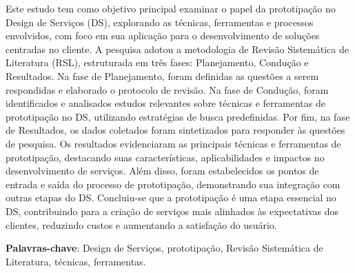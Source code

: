 \begin{resumo}
Este estudo tem como objetivo principal examinar o papel da prototipação no Design de Serviços (DS), explorando as técnicas, ferramentas e processos envolvidos, com foco em sua aplicação para o desenvolvimento de soluções centradas no cliente. A pesquisa adotou a metodologia de Revisão Sistemática de Literatura (RSL), estruturada em três fases: Planejamento, Condução e Resultados. Na fase de Planejamento, foram definidas as questões a serem respondidas e elaborado o protocolo de revisão. Na fase de Condução, foram identificados e analisados estudos relevantes sobre técnicas e ferramentas de prototipação no DS, utilizando estratégias de busca predefinidas. Por fim, na fase de Resultados, os dados coletados foram sintetizados para responder às questões de pesquisa. Os resultados evidenciaram as principais técnicas e ferramentas de prototipação, destacando suas características, aplicabilidades e impactos no desenvolvimento de serviços. Além disso, foram estabelecidos os pontos de entrada e saída do processo de prototipação, demonstrando sua integração com outras etapas do DS. Concluiu-se que a prototipação é uma etapa essencial no DS, contribuindo para a criação de serviços mais alinhados às expectativas dos clientes, reduzindo custos e aumentando a satisfação do usuário.

 \vspace{\onelineskip}
    
 \noindent
 \textbf{Palavras-chave}: Design de Serviços, prototipação, Revisão Sistemática de Literatura, técnicas, ferramentas.
\end{resumo}

